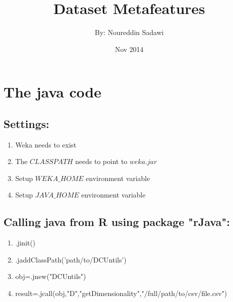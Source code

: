 \documentclass[a4paper,12pt, english]{article}
\begin{document}
\title{Dataset Metafeatures}
\date{Nov 2014}
\author{By: Noureddin Sadawi}
\maketitle

\large
\section{The java code}
\subsection{Settings:}
\begin{enumerate}
	\item Weka needs to exist
	\item The $CLASSPATH$ needs to point to $weka.jar$
	\item Setup $WEKA\_HOME$ environment variable
	\item Setup $JAVA\_HOME$ environment variable			
\end{enumerate} 

\subsection{Calling java from R using package "rJava":}
\begin{enumerate}
	\item .jinit()
	\item .jaddClassPath('path/to/DCUntils')
	\item obj=.jnew("DCUntils")
	\item result=.jcall(obj,"D","getDimensionality","/full/path/to/csv/file.csv")

\end{enumerate}    
\end{document}
